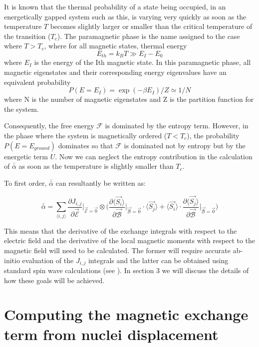 \documentclass[10pt]{article}
\begin{document}
It is known that the thermal probability of a state being occupied, in an energetically gapped system such as this, is varying very quickly as soon as the temperature $T$ becomes slightly larger or smaller than the critical temperature of the transition ($T_c$). The paramagnetic phase is the name assigned to the case where $T > T_c$, where for all magnetic states, thermal energy $$E_{th} = k_B T \gg E_I - E_0$$ where $E_I$ is the energy of the Ith magnetic state. In this paramagnetic phase, all magnetic eigenstates and their corresponding energy eigenvalues have an equivalent probability $$P(E = E_I) = \exp(-\beta E_I)/Z \simeq 1/N$$ where N is the number of magnetic eigenstates and Z is the partition function for the system. 

Consequently, the free energy $\mathcal{F}$ is dominated by the entropy term. However, in the phase where the system is magnetically ordered ($T < T_c$), the probability $P(E = E_{ground})$ dominates so that $\mathcal{F}$ is dominated not by entropy but by the energetic term $U$. Now we can neglect the entropy contribution in the calculation of $\bar{\bar{\alpha}}$ as soon as the temperature is slightly smaller than $T_c$.

To first order, $\bar{\bar{\alpha}}$ can resultantly be written as:

\begin{equation}
	\bar{\bar{\alpha}} = \sum_{\langle i,j \rangle} \frac{\partial J_{i,j}}{\partial \vec{\mathcal{E}}}\biggr\vert_{\vec{\mathcal{E}}=\vec{0}}\otimes\biggr(\frac{\partial \langle \vec{S_i}\rangle}{\partial \vec{\mathcal{B}}}\biggr\vert_{\vec{\mathcal{B}} = \vec{0}}\cdot\langle\vec{S_j}\rangle + \langle\vec{S_i}\rangle\cdot\frac{\partial \langle \vec{S_j}\rangle}{\partial\vec{\mathcal{B}}}\biggr\vert_{\vec{\mathcal{B}}=\vec{0}}\biggr)
\end{equation}

This means that the derivative of the exchange integrals with respect to the electric field and the derivative of the local magnetic moments with respect to the magnetic field will need to be calculated. The former will require accurate ab-initio evaluation of the $J_{i,j}$ integrals and the latter can be obtained using standard spin wave calculations (see \cite{anderson1951limits,kubo1952spin,oguchi1960theory}). In section 3 we will discuss the details of how these goals will be achieved.

\section{Computing the magnetic exchange term from nuclei displacement}
\end{document}
